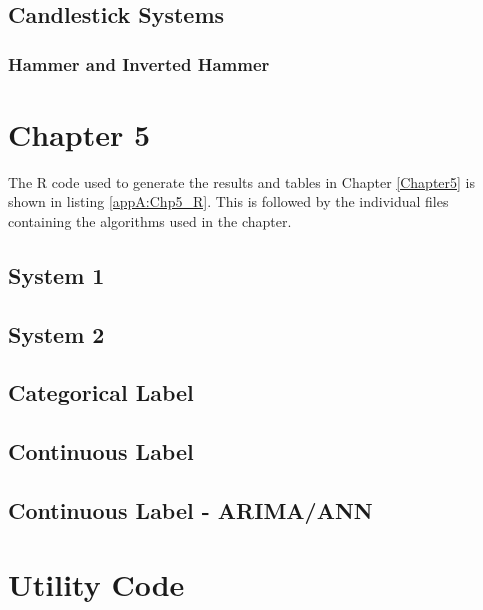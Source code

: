 
\label{appA:bout_Quant90}

\subsection{Candlestick Systems}
\subsubsection{Hammer and Inverted Hammer}

\label{appA:Hammer}


\label{appA:Hammer_aroon}


\label{appA:Engulf}


\label{appA:Engulf_aroon}


\label{appA:Doji_aroon}

\section{Chapter 5}
The R code used to generate the results and tables in Chapter \ref{Chapter5} is shown in listing \ref{appA:Chp5_R}. This is followed by the individual files containing the algorithms used in the chapter.


\label{appA:Chp5_R}

\subsection{System 1}

\label{appA:ts_1}

\subsection{System 2}

\label{appA:ts_2}

\subsection{Categorical Label}

\label{appA:ts_4}

\subsection{Continuous Label}

\label{appA:ts_3}

\subsection{Continuous Label - ARIMA/ANN}

\label{appA:ts_3a}

\section{Utility Code}
\label{appA:utility}

